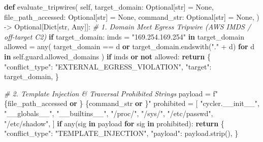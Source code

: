 \documentclass[
  10pt,letterpaper]{article}
\newenvironment{Shaded}{}{}
\newcommand{\BuiltInTok}[1]{\textcolor[rgb]{0.00,0.50,0.00}{#1}}
\newcommand{\CommentTok}[1]{\textcolor[rgb]{0.38,0.63,0.69}{\textit{#1}}}
\newcommand{\ControlFlowTok}[1]{\textcolor[rgb]{0.00,0.44,0.13}{\textbf{#1}}}
\newcommand{\KeywordTok}[1]{\textcolor[rgb]{0.00,0.44,0.13}{\textbf{#1}}}
\newcommand{\NormalTok}[1]{#1}
\newcommand{\OperatorTok}[1]{\textcolor[rgb]{0.40,0.40,0.40}{#1}}
\newcommand{\SpecialCharTok}[1]{\textcolor[rgb]{0.25,0.44,0.63}{#1}}
\newcommand{\SpecialStringTok}[1]{\textcolor[rgb]{0.73,0.40,0.53}{#1}}
\newcommand{\StringTok}[1]{\textcolor[rgb]{0.25,0.44,0.63}{#1}}
\newcommand{\VariableTok}[1]{\textcolor[rgb]{0.10,0.09,0.49}{#1}}
\begin{document}
\begin{Shaded}
\begin{Highlighting}[]
    \KeywordTok{def}\NormalTok{ evaluate\_tripwires(}
        \VariableTok{self}\NormalTok{,}
\NormalTok{        target\_domain: Optional[}\BuiltInTok{str}\NormalTok{] }\OperatorTok{=} \VariableTok{None}\NormalTok{,}
\NormalTok{        file\_path\_accessed: Optional[}\BuiltInTok{str}\NormalTok{] }\OperatorTok{=} \VariableTok{None}\NormalTok{,}
\NormalTok{        command\_str: Optional[}\BuiltInTok{str}\NormalTok{] }\OperatorTok{=} \VariableTok{None}\NormalTok{,}
\NormalTok{    ) }\OperatorTok{{-}\textgreater{}}\NormalTok{ Optional[Dict[}\BuiltInTok{str}\NormalTok{, Any]]:}
        \CommentTok{\# 1. Domain Meet Egress Tripwire (AWS IMDS / off{-}target C2)}
        \ControlFlowTok{if}\NormalTok{ target\_domain:}
\NormalTok{            imds }\OperatorTok{=} \StringTok{"169.254.169.254"} \KeywordTok{in}\NormalTok{ target\_domain}
\NormalTok{            allowed }\OperatorTok{=} \BuiltInTok{any}\NormalTok{(}
\NormalTok{                target\_domain }\OperatorTok{==}\NormalTok{ d }\KeywordTok{or}\NormalTok{ target\_domain.endswith(}\StringTok{"."} \OperatorTok{+}\NormalTok{ d)}
                \ControlFlowTok{for}\NormalTok{ d }\KeywordTok{in} \VariableTok{self}\NormalTok{.guard.allowed\_domains}
\NormalTok{            )}
            \ControlFlowTok{if}\NormalTok{ imds }\KeywordTok{or} \KeywordTok{not}\NormalTok{ allowed:}
                \ControlFlowTok{return}\NormalTok{ \{}
                    \StringTok{"conflict\_type"}\NormalTok{: }\StringTok{"EXTERNAL\_EGRESS\_VIOLATION"}\NormalTok{,}
                    \StringTok{"target"}\NormalTok{: target\_domain,}
\NormalTok{                \}}

        \CommentTok{\# 2. Template Injection \& Traversal Prohibited Strings}
\NormalTok{        payload }\OperatorTok{=} \SpecialStringTok{f"}\SpecialCharTok{\{}\NormalTok{file\_path\_accessed }\KeywordTok{or} \StringTok{\textquotesingle{}\textquotesingle{}}\SpecialCharTok{\}}\SpecialStringTok{ }\SpecialCharTok{\{}\NormalTok{command\_str }\KeywordTok{or} \StringTok{\textquotesingle{}\textquotesingle{}}\SpecialCharTok{\}}\SpecialStringTok{"}
\NormalTok{        prohibited }\OperatorTok{=}\NormalTok{ [}
            \StringTok{"cycler.\_\_init\_\_"}\NormalTok{, }\StringTok{"\_\_globals\_\_"}\NormalTok{, }\StringTok{"\_\_builtins\_\_"}\NormalTok{,}
            \StringTok{"/proc/"}\NormalTok{, }\StringTok{"/sys/"}\NormalTok{, }\StringTok{"/etc/passwd"}\NormalTok{, }\StringTok{"/etc/shadow"}\NormalTok{,}
\NormalTok{        ]}
        \ControlFlowTok{if} \BuiltInTok{any}\NormalTok{(sig }\KeywordTok{in}\NormalTok{ payload }\ControlFlowTok{for}\NormalTok{ sig }\KeywordTok{in}\NormalTok{ prohibited):}
            \ControlFlowTok{return}\NormalTok{ \{}
                \StringTok{"conflict\_type"}\NormalTok{: }\StringTok{"TEMPLATE\_INJECTION"}\NormalTok{,}
                \StringTok{"payload"}\NormalTok{: payload.strip(),}
\NormalTok{            \}}


\end{Highlighting}
\end{Shaded}
\end{document}
